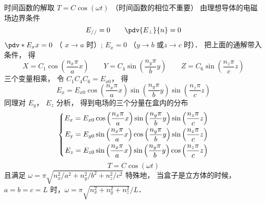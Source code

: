 时间函数的解取 $T = C\cos \left( {\omega t} \right)$ （时间函数的相位不重要）
由理想导体的电磁场边界条件%
\begin{equation}
{E_{//}} = 0
\qquad
\pdv{E_\bot}{n} = 0
\end{equation}  
 $\pdv*{E_x}{x} = 0$ （ $x \to a$ 时）;  ${E_x} = 0$ （$y \to b$ 或$z \to c$ 时）． 把上面的通解带入条件， 得
\begin{equation}
X = {C_1}\cos \left( {\frac{{{n_x}\pi }}{a}x} \right)
\qquad
Y = {C_4}\sin \left( {\frac{{{n_y}\pi }}{b}y} \right)
\qquad
Z = {C_6}\sin \left( {\frac{{{n_z}\pi }}{c}z} \right)
\end{equation}  
三个变量相乘， 令 ${C_1}{C_4}{C_6} = {E_{x0}}$，  得
\begin{equation}
{E_x} = {E_{x0}}\cos \left( {\frac{{{n_x}\pi }}{a}x} \right)\sin \left( {\frac{{{n_y}\pi }}{b}y} \right)\sin \left( {\frac{{{n_z}\pi }}{c}z} \right)
\end{equation} 
同理对 ${E_y}$，  ${E_z}$ 分析， 得到电场的三个分量在盒内的分布
\begin{equation}
\left\{ \begin{aligned}
{E_x} = {E_{x0}}\cos \left( {\frac{{{n_x}\pi }}{a}x} \right)\sin \left( {\frac{{{n_y}\pi }}{b}y} \right)\sin \left( {\frac{{{n_z}\pi }}{c}z} \right)\\
{E_{\rm{y}}} = {E_{y0}}\sin \left( {\frac{{{n_x}\pi }}{a}x} \right)\cos \left( {\frac{{{n_y}\pi }}{b}y} \right)\sin \left( {\frac{{{n_z}\pi }}{c}z} \right)\\
{E_z} = {E_{z0}}\sin \left( {\frac{{{n_x}\pi }}{a}x} \right)\sin \left( {\frac{{{n_y}\pi }}{b}y} \right)\cos \left( {\frac{{{n_z}\pi }}{c}z} \right)
\end{aligned} \right.
\end{equation} 
\begin{equation}
T = C\cos \left( {\omega t} \right)
\end{equation}
且满足 $\omega  = \pi \sqrt {{{n_x^2}/}{{{a^2}}} + {{n_y^2}}/{{{b^2}}} + {{n_z^2}}/{{{c^2}}}} $
特殊地， 当盒子是立方体的时候， $a = b = c = L$ 时，$\omega  = {\pi }\sqrt {n_x^2 + n_y^2 + n_z^2}/L $．   




